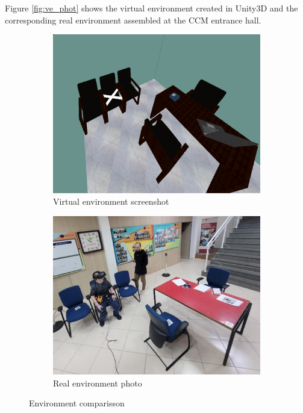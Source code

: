     Figure \ref{fig:ve_phot} shows the virtual environment created in Unity3D and the corresponding real environment assembled at the CCM entrance hall. 

    \begin{figure}[!htb]
        \centering
        \begin{subfigure}[b]{0.75\linewidth}
            \centering
            \includegraphics[width=\linewidth]{2 - Metodologia/VE.png}
            \caption{Virtual environment screenshot}
            \label{fig:ve_photo}
        \end{subfigure}
        \hfill
        \begin{subfigure}[b]{0.75\linewidth}
            \centering
            \includegraphics[width=\linewidth]{2 - Metodologia/RE.jpg}
            \caption{Real environment photo}
            \label{fig:re_photo}
        \end{subfigure}
        \caption{Environment comparisson}
        \label{fig:ve_re}
    \end{figure}


